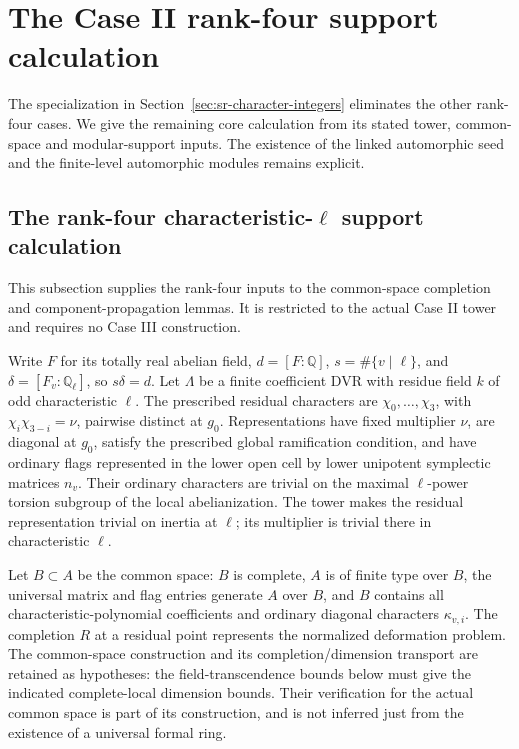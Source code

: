 \section{The Case II rank-four support calculation}
\label{sec:sr-rank-four-support}
The specialization in Section~\ref{sec:sr-character-integers} eliminates
the other rank-four cases. We give the remaining core calculation
from its stated tower, common-space and modular-support inputs.
The existence of the linked automorphic seed and the finite-level
automorphic modules remains explicit.

\subsection{The rank-four characteristic-\(\ell\) support calculation}
\label{subsec:sr-rank-four-core}
This subsection supplies the rank-four inputs to the common-space
completion and component-propagation lemmas. It is restricted to the
actual Case II tower and requires no Case III construction.

Write \(F\) for its totally real abelian field,
\(d=[F:\mathbb Q]\), \(s=\#\{v\mid\ell\}\), and
\(\delta=[F_v:\mathbb Q_\ell]\), so \(s\delta=d\).
Let \(\Lambda\) be a finite coefficient DVR with residue field \(k\)
of odd characteristic \(\ell\).
The prescribed residual characters are \(\chi_0,\ldots,\chi_3\),
with \(\chi_i\chi_{3-i}=\nu\), pairwise distinct at \(g_0\).
Representations have fixed multiplier \(\nu\), are diagonal at
\(g_0\), satisfy the prescribed global ramification condition,
and have ordinary flags represented in the lower open cell by
lower unipotent symplectic matrices \(n_v\).
Their ordinary characters are trivial on the maximal
\(\ell\)-power torsion subgroup of the local abelianization.
The tower makes the residual representation trivial on inertia
at \(\ell\); its multiplier is trivial there in characteristic
\(\ell\).

Let \(B\subset A\) be the common space: \(B\) is complete,
\(A\) is of finite type over \(B\), the universal matrix and flag
entries generate \(A\) over \(B\), and \(B\) contains all
characteristic-polynomial coefficients and ordinary diagonal
characters \(\kappa_{v,i}\).
The completion \(R\) at a residual point represents the normalized
deformation problem. The common-space construction and its completion/dimension transport
are retained as hypotheses: the field-transcendence bounds below must
give the indicated complete-local dimension bounds. Their verification
for the actual common space is part of its construction, and is not
inferred just from the existence of a universal formal ring.

